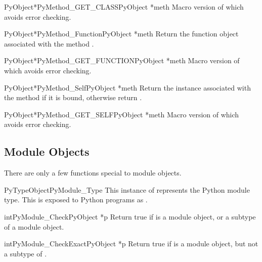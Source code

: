 \begin{cfuncdesc}{PyObject*}{PyMethod_GET_CLASS}{PyObject *meth}
  Macro version of  which avoids error
  checking.
\end{cfuncdesc}

\begin{cfuncdesc}{PyObject*}{PyMethod_Function}{PyObject *meth}
  Return the function object associated with the method .
\end{cfuncdesc}

\begin{cfuncdesc}{PyObject*}{PyMethod_GET_FUNCTION}{PyObject *meth}
  Macro version of  which avoids error
  checking.
\end{cfuncdesc}

\begin{cfuncdesc}{PyObject*}{PyMethod_Self}{PyObject *meth}
  Return the instance associated with the method  if it is
  bound, otherwise return \NULL{}.
\end{cfuncdesc}

\begin{cfuncdesc}{PyObject*}{PyMethod_GET_SELF}{PyObject *meth}
  Macro version of  which avoids error
  checking.
\end{cfuncdesc}


\subsection{Module Objects \label{moduleObjects}}

There are only a few functions special to module objects.

\begin{cvardesc}{PyTypeObject}{PyModule_Type}
  This instance of  represents the Python module
  type.  This is exposed to Python programs as
  .
\end{cvardesc}

\begin{cfuncdesc}{int}{PyModule_Check}{PyObject *p}
  Return true if  is a module object, or a subtype of a module
  object.
\end{cfuncdesc}

\begin{cfuncdesc}{int}{PyModule_CheckExact}{PyObject *p}
  Return true if  is a module object, but not a subtype of
  .
\end{cfuncdesc}

